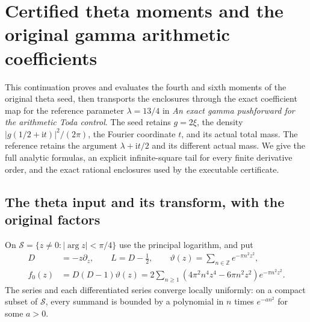\begingroup
\def\ii{\mathrm i}
\def\dd{\,\mathrm d}
\def\M{\mathcal M}
\def\F{\mathcal F}
\section{Certified theta moments and the original gamma arithmetic coefficients}



This continuation proves and evaluates the fourth and sixth moments of the
original theta seed, then transports the enclosures through the exact
coefficient map for the reference parameter $\lambda=13/4$ in
\emph{An exact gamma pushforward for the arithmetic Toda control}.
The seed retains $g=2\xi$, the density $|g(1/2+\ii t)|^2/(2\pi)$,
the Fourier coordinate $t$, and its actual total mass. The reference
retains the argument $\lambda+\ii t/2$ and its different actual mass.
We give the full analytic formulas, an explicit infinite-square tail for
every finite derivative order, and the exact rational enclosures used
by the executable certificate.

\subsection{The theta input and its transform, with the original factors}

On $\mathcal S=\{z\ne0:|\arg z|<\pi/4\}$ use the principal
logarithm, and put
\begin{align}
 D&=-z\partial_z,\qquad L=D-\tfrac12,\qquad
 \vartheta(z)=\sum_{n\in\mathbb Z}e^{-\pi n^2z^2},\tag{GS.1}\\
 f_0(z)&=D(D-1)\vartheta(z)
 =2\sum_{n\ge1}(4\pi^2n^4z^4-6\pi n^2z^2)e^{-\pi n^2z^2}.
 \tag{GS.2}
\end{align}
The series and each differentiated series converge locally uniformly:
on a compact subset of $\mathcal S$, every summand is bounded by
a polynomial in $n$ times $e^{-a n^2}$ for some $a>0$.

